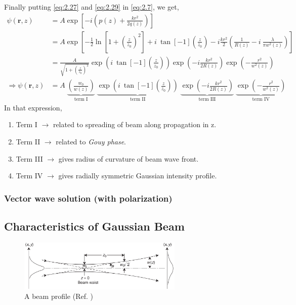 \documentclass[11pt,a4paper]{article}
\numberwithin{equation}{section}
\begin{document}
Finally putting \ref{eq:2.27} and \ref{eq:2.29} in \ref{eq:2.7}, we get,\cite{kogelnik 66}\cite{cornell}
\begin{align}
	\psi(\boldsymbol{r},z)&= A\exp\left[-i\left(p(z) + \frac{kr^2}{2q(z)}\right)\right]\nonumber\\
	&= A\exp\left[- \frac{1}{2}\ln\left[1+ \left(\frac{z}{z_0}\right)^2\right]+i\: \tan[-1](\frac{z}{z_0}) -i \frac{kr^2}{2}\left(\frac{1}{R(z)} - i\: \frac{\lambda}{\pi w^2(z)}\right) \right]\nonumber\\
	&=\frac{A}{\sqrt{1+ \left(\frac{z}{z_0}\right)^2}} \exp(i\:\tan[-1](\frac{z}{z_0})) \exp(-i\frac{kr^2}{2R(z)}) \exp(-\frac{r^2}{w^2(z)}) \nonumber\\
	\Rightarrow \psi(\boldsymbol{r},z)&=A\; 
	\underbrace{\left(\frac{w_0}{w(z)}\right)}_{\text{term I}}\;
	\underbrace{\exp(i{\:}\tan[-1](\frac{z}{z_0}))}_{\text{term II}}\; \underbrace{\exp(-i\frac{kr^2}{2R(z)})}_{\text{term III}}\;
	\underbrace{\exp(-\frac{r^2}{w^2(z)})}_{\text{term IV}} \label{eq:2.30}
\end{align} 
In that expression,
\begin{enumerate}
	\item Term I $\longrightarrow$ related to spreading of beam along propagation in z.
	\item Term II $\longrightarrow$ related to \textit{Gouy phase}.
	\item Term III $\longrightarrow$ gives radius of curvature of beam wave front.
	\item Term IV $\longrightarrow$ gives radially symmetric Gaussian intensity profile.
	
\end{enumerate}

\subsubsection{Vector wave solution (with polarization)}
\cite{babiker 12}\cite{conry 12}\cite{erikson 94}\cite{hall 96}\cite{lewis 14}

\subsection{Characteristics of Gaussian Beam }
\begin{figure}[H]
	\centering
	\includegraphics[width=0.7\textwidth]{beam.png}
	\caption{A beam profile (Ref. \cite{milonni})}
	\label{fig:beam}
\end{figure}
\end{document}
